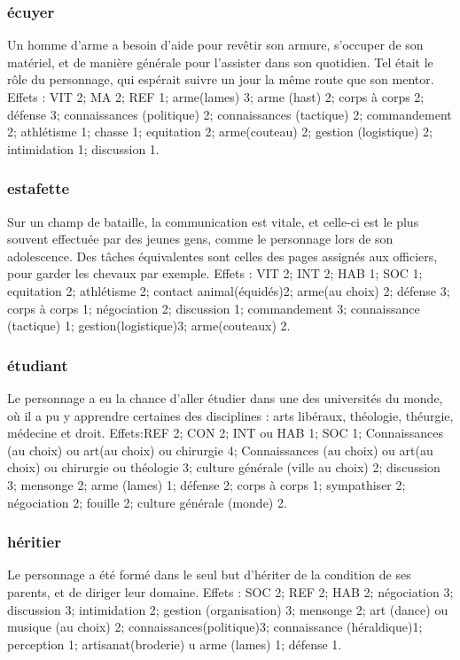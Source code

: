 \documentclass[10pt,a4paper,twocolumn]{book}
\begin{document}
\subsubsection{écuyer}
Un homme d’arme a besoin d’aide pour revêtir son armure, s’occuper de son matériel, et de manière générale pour l’assister dans son quotidien. Tel était le rôle du personnage, qui espérait suivre un jour la même route que son mentor.
Effets : VIT 2; MA 2; REF 1; arme(lames) 3; arme (hast) 2; corps à corps 2; défense 3; connaissances (politique) 2; connaissances (tactique) 2; commandement 2; athlétisme 1; chasse 1; equitation 2; arme(couteau) 2; gestion (logistique) 2; intimidation 1; discussion 1.
\subsubsection{estafette}
Sur un champ de bataille, la communication est vitale, et celle-ci est le plus souvent effectuée par des jeunes gens, comme le personnage lors de son adolescence. Des tâches équivalentes sont celles des pages assignés aux officiers, pour garder les chevaux par exemple.
Effets : VIT 2; INT 2; HAB 1; SOC 1; equitation 2; athlétisme 2; contact animal(équidés)2; arme(au choix) 2; défense 3; corps à corps 1; négociation 2; discussion 1; commandement 3; connaissance (tactique) 1; gestion(logistique)3; arme(couteaux) 2.
\subsubsection{étudiant}
Le personnage a eu la chance d’aller étudier dans une des universités du monde, où il a pu y apprendre certaines des disciplines : arts libéraux, théologie, théurgie, médecine et droit.
Effets:REF 2; CON 2; INT ou HAB 1; SOC 1; Connaissances (au choix) ou art(au choix) ou chirurgie 4; Connaissances (au choix) ou art(au choix) ou chirurgie ou théologie 3; culture générale (ville au choix) 2; discussion 3; mensonge 2; arme (lames) 1; défense 2; corps à corps 1; sympathiser 2; négociation 2; fouille 2; culture générale (monde) 2.
\subsubsection{héritier}
Le personnage a été formé dans le seul but d’hériter de la condition de ses parents, et de diriger leur domaine.
Effets : SOC 2; REF 2; HAB 2; négociation 3; discussion 3; intimidation 2; gestion (organisation) 3; mensonge 2; art (dance) ou musique (au choix) 2; connaissances(politique)3; connaissance (héraldique)1; perception 1; artisanat(broderie) u arme (lames) 1; défense 1.
\end{document}
